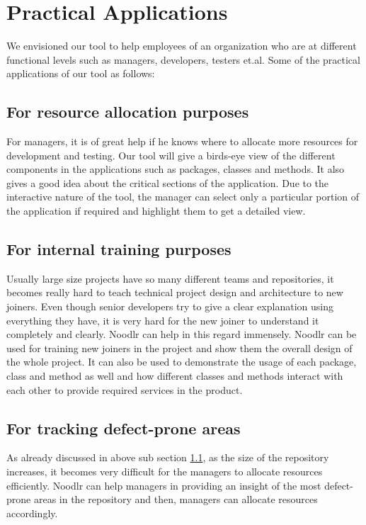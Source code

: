 
\section{Practical Applications}
\label{sec:practical}
We envisioned our tool to help employees of an organization who are at different functional levels such as managers, developers, testers et.al. Some of the practical applications of our tool as follows:

\subsection{For resource allocation purposes}
\label{sec:resource_allocation}

For managers, it is of great help if he knows where to allocate more resources for development and testing. Our tool will give a birds-eye view of the different components in the applications such as packages, classes and methods. It also gives a good idea about the critical sections of the application. Due to the interactive nature of the tool, the manager can select only a particular portion of the application if required and highlight them to get a detailed view.

\subsection{For internal training purposes}
Usually large size projects have so many different teams and repositories, it becomes really hard to teach technical project design and architecture to new joiners. Even though senior developers try to give a clear explanation using everything they have, it is very hard for the new joiner to understand it completely and clearly. Noodlr can help in this regard immensely. Noodlr can be used for training new joiners in the project and show them the overall design of the whole project. It can also be used to demonstrate the usage of each package, class and method as well and how different classes and methods interact with each other to provide required services in the product.

\subsection{For tracking defect-prone areas}
As already discussed in above sub section \ref{sec:resource_allocation}, as the size of the repository increases, it becomes very difficult for the managers to allocate resources efficiently. Noodlr can help managers in providing an insight of the most defect-prone areas in the repository and then, managers can allocate resources accordingly. 

